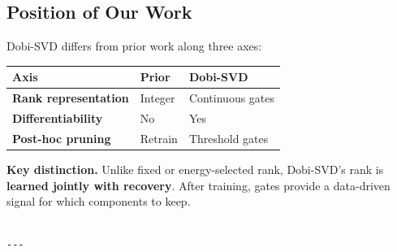 \subsection{Position of Our Work}

Dobi-SVD differs from prior work along three axes:

\begin{table}[H]
\centering
\small
\begin{tabular}{lll}
\toprule
\textbf{Axis} & \textbf{Prior} & \textbf{Dobi-SVD} \\
\midrule
\textbf{Rank representation} & Integer & Continuous gates \\
\textbf{Differentiability} & No & Yes \\
\textbf{Post-hoc pruning} & Retrain & Threshold gates \\
\bottomrule
\end{tabular}
\end{table}

\textbf{Key distinction.} Unlike fixed or energy-selected rank, Dobi-SVD's rank 
is \textbf{learned jointly with recovery}. After training, gates provide a 
data-driven signal for which components to keep.
\begin{lstlisting}

---
\end{lstlisting}